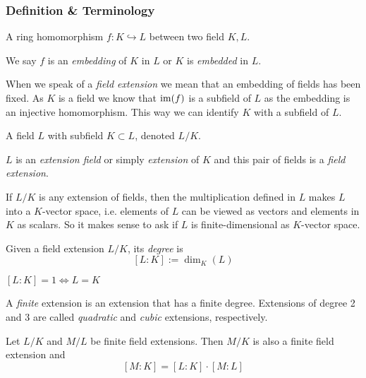 \subsubsection{Definition \& Terminology}
\begin{definition}
   A ring homomorphism \(f: K \hookrightarrow L\) between two field \(K, L\).
\end{definition}
\begin{remark}[Terminology]
   We say \(f\) is an \emph{embedding} of \(K\) in \(L\) or \(K\) is \emph{embedded} in \(L\).
\end{remark}
When we speak of a \emph{field extension} we mean that an embedding of fields has been fixed.
As \(K\) is a field we know that \(\operatorname{im}(f)\) is a subfield of \(L\) as the embedding is an injective homomorphism.
This way we can identify \(K\) with a subfield of \(L\).
\begin{definition}
   A field \(L\) with subfield \(K \subset L\), denoted \(L/K\).
\end{definition}
\begin{remark}[Terminology]
   \(L\) is an \emph{extension field} or simply \emph{extension} of \(K\) and this pair of fields is a \emph{field extension}.
\end{remark}
If \(L/K\) is any extension of fields, then the multiplication defined in \(L\) makes \(L\) into a \(K\)-vector space, i.e. elements of \(L\) can be viewed as vectors and elements in \(K\) as scalars.
So it makes sense to ask if \(L\) is finite-dimensional as \(K\)-vector space.

\begin{definition}
   Given a field extension \(L/K\), its \emph{degree} is
   \[[L:K] := \dim_K(L)\]
\end{definition}
\begin{remark}
   \([L:K] = 1 \iff L = K\)
\end{remark}
\begin{remark}[Terminology]
   A \emph{finite} extension is an extension that has a finite degree.
   Extensions of degree 2 and 3 are called \emph{quadratic} and \emph{cubic} extensions, respectively.
\end{remark}

\begin{proposition}
   Let \(L/K\) and \(M/L\) be finite field extensions.
   Then \(M/K\) is also a finite field extension and
   \[[M:K] = [L:K] \cdot [M:L]\]
\end{proposition}

